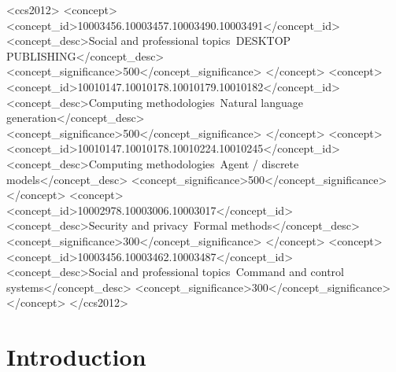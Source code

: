 \documentclass[sigconf,review,anonymous=false]{acmart} %
\begin{document}
\begin{CCSXML}
<ccs2012>
   <concept>
       <concept_id>10003456.10003457.10003490.10003491</concept_id>
       <concept_desc>Social and professional topics~DESKTOP PUBLISHING</concept_desc>
       <concept_significance>500</concept_significance>
       </concept>
   <concept>
       <concept_id>10010147.10010178.10010179.10010182</concept_id>
       <concept_desc>Computing methodologies~Natural language generation</concept_desc>
       <concept_significance>500</concept_significance>
       </concept>
   <concept>
       <concept_id>10010147.10010178.10010224.10010245</concept_id>
       <concept_desc>Computing methodologies~Agent / discrete models</concept_desc>
       <concept_significance>500</concept_significance>
       </concept>
   <concept>
       <concept_id>10002978.10003006.10003017</concept_id>
       <concept_desc>Security and privacy~Formal methods</concept_desc>
       <concept_significance>300</concept_significance>
       </concept>
   <concept>
       <concept_id>10003456.10003462.10003487</concept_id>
       <concept_desc>Social and professional topics~Command and control systems</concept_desc>
       <concept_significance>300</concept_significance>
       </concept>
 </ccs2012>
\end{CCSXML}



\maketitle

\section{Introduction}
\label{sec:introduction}
\end{document}
